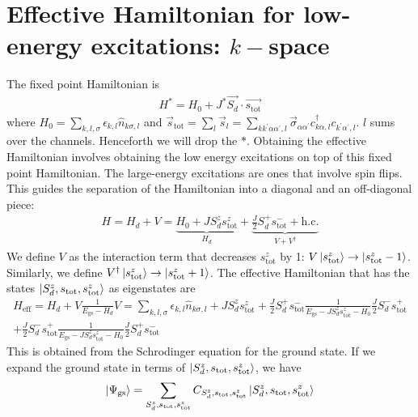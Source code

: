 \documentclass{revtex4-2}
\numberwithin{equation}{section}
\begin{document}
\section{Effective Hamiltonian for low-energy excitations: \(k-\)space}
The fixed point Hamiltonian is
\begin{equation}\begin{aligned}
	H^* = H_0 + J^* \vec{S_d}\cdot\vec{s_\text{tot}}
\end{aligned}\end{equation}
where \(H_0 = \sum_{k,l,\sigma}\epsilon_{k,l}\hat n_{k\sigma,l}\) and \(\vec s_\text{tot} = \sum_l \vec s_l = \sum_{kk^\prime\alpha\alpha^\prime,l} \vec \sigma_{\alpha\alpha^\prime}c^\dagger_{k\alpha,l}c_{k^\prime\alpha^\prime,l}\). \(l\) sums over the channels. Henceforth we will drop the \(*\). Obtaining the effective Hamiltonian involves obtaining the low energy excitations on top of this fixed point Hamiltonian. The large-energy excitations are ones that involve spin flips. This guides the separation of the Hamiltonian into a diagonal and an off-diagonal piece:
\begin{equation}\begin{aligned}
	H = H_d + V = \underbrace{H_0 + J S_d^z s_\text{tot}^z}_{H_d} + \underbrace{\frac{J}{2}S_d^+ s_\text{tot}^- + \text{h.c.}}_{V + V^\dagger}
\end{aligned}\end{equation}
We define \(V\) as the interaction term that decreases \(s_\text{tot}^z\) by 1: \(V \ket{s_\text{tot}^z} \to \ket{s_\text{tot}^z - 1}\). Similarly, we define \(V^\dagger \ket{s_\text{tot}^z} \to \ket{s_\text{tot}^z + 1}\). The effective Hamiltonian that has the states \(\ket{S_d^z, s_\text{tot}, s_\text{tot}^z}\) as eigenstates are
\begin{equation}\begin{aligned}
	H_\text{eff} = H_d + V \frac{1}{E_\text{gs} - H_d}V = \sum_{k,l,\sigma}\epsilon_{k,l}\hat n_{k\sigma,l} + J S_d^z s_\text{tot}^z + \frac{J}{2}S_d^+ s_\text{tot}^- \frac{1}{E_\text{gs} - J S_d^z s_\text{tot}^z - H_0}\frac{J}{2}S_d^- s_\text{tot}^+\\
	+\frac{J}{2}S_d^- s_\text{tot}^+ \frac{1}{E_\text{gs} - J S_d^z s_\text{tot}^z - H_0}\frac{J}{2}S_d^+ s_\text{tot}^-
\end{aligned}\end{equation}
This is obtained from the Schrodinger equation for the ground state. If we expand the ground state in terms of \(\ket{S_d^z, s_\text{tot}, s_\text{tot}^z}\), we have 
\begin{equation}\begin{aligned}
	\label{gstate_Expand}
\ket{\Psi_\text{gs}} = \sum_{S_d^z, s_\text{tot},s_\text{tot}^z}C_{S_d^z, s_\text{tot},s_\text{tot}^z}\ket{S_d^z, s_\text{tot}, s_\text{tot}^z}
\end{aligned}\end{equation}
\end{document}
